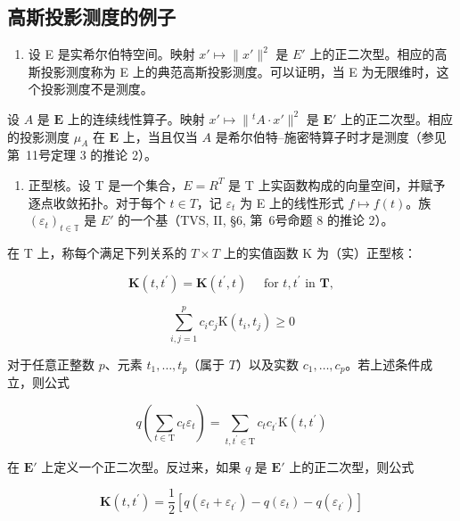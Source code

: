 \subsection{高斯投影测度的例子}

\begin{enumerate}
\def\labelenumi{\arabic{enumi})}
\tightlist
\item
  设 E 是实希尔伯特空间。映射 \(x' \mapsto \|x'\|^2\) 是 \(E'\) 上的正二次型。相应的高斯投影测度称为 E 上的典范高斯投影测度。可以证明，当 E 为无限维时，这个投影测度不是测度。
\end{enumerate}

设 \(A\) 是 \(\mathbf{E}\) 上的连续线性算子。映射 \(x' \mapsto \|{}^{t} A \cdot x'\|^2\) 是 \(\mathbf{E}'\) 上的正二次型。相应的投影测度 \(\mu_A\) 在 \(\mathbf{E}\) 上，当且仅当 \(A\) 是希尔伯特--施密特算子时才是测度（参见第~11号定理 3 的推论 2）。

\begin{enumerate}
\def\labelenumi{\arabic{enumi})}
\setcounter{enumi}{1}
\tightlist
\item
  正型核。设 T 是一个集合，\(E = R^{T}\) 是 T 上实函数构成的向量空间，并赋予逐点收敛拓扑。对于每个 \(t \in T\)，记 \(\varepsilon_{t}\) 为 E 上的线性形式 \(f \mapsto f(t)\)。族 \((\varepsilon_{t})_{t \in \mathbb{T}}\) 是 \(E'\) 的一个基（TVS, II, §6, 第~6号命题 8 的推论 2）。
\end{enumerate}

在 T 上，称每个满足下列关系的 \(T \times T\) 上的实值函数 K 为（实）正型核：

\[
\mathbf {K} (t, t ^ {\prime}) = \mathbf {K} (t ^ {\prime}, t) \quad \text { for } t, t ^ {\prime} \text { in } \mathbf {T},\tag{20}
\]

\[
\sum_ {i, j = 1} ^ {p} c _ {i} c _ {j} \mathrm{K} (t _ {i}, t _ {j}) \geqslant 0\tag{21}
\]

 对于任意正整数 \(p\)、元素 \(t_1, \ldots, t_p\)（属于 \(T\)）以及实数 \(c_1, \ldots, c_p\)。若上述条件成立，则公式

\[
q \left(\sum_ {t \in \mathrm{T}} c _ {t} \varepsilon_ {t}\right) = \sum_ {t, t ^ {\prime} \in \mathrm{T}} c _ {t} c _ {t ^ {\prime}} \mathrm{K} (t, t ^ {\prime})\tag{22}
\]

在 \(\mathbf{E}'\) 上定义一个正二次型。反过来，如果 \(q\) 是 \(\mathbf{E}'\) 上的正二次型，则公式

\[
\mathbf {K} (t, t ^ {\prime}) = \frac {1}{2} [ q (\varepsilon_ {t} + \varepsilon_ {t ^ {\prime}}) - q (\varepsilon_ {t}) - q (\varepsilon_ {t ^ {\prime}}) ]\tag{23}
\]

